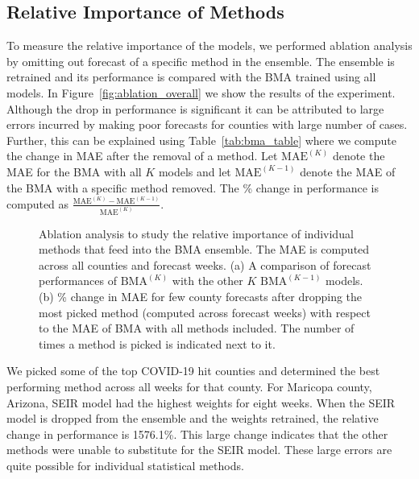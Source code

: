 \documentclass[sigconf]{acmart}
\begin{document}
\subsection{Relative Importance of Methods}
To measure the relative importance of the models, we performed ablation analysis by omitting out forecast of a specific method in the ensemble. The ensemble is retrained and its performance is compared with the BMA trained using all models. In Figure~\ref{fig:ablation_overall} we show the results of the experiment. Although the drop in performance is significant it can be attributed to large errors incurred by making poor forecasts for counties with large number of cases. Further, this can be explained using Table~\ref{tab:bma_table} where we compute the change in MAE after the removal of a method. Let $\text{MAE}^{(K)}$ denote the MAE for the BMA with all $K$ models and let $\text{MAE}^{(K-1)}$ denote the MAE of the BMA with a specific method removed. The \% change in performance is computed as $\frac{\text{MAE}^{(K)}-\text{MAE}^{(K-1)}}{\text{MAE}^{(K)}}$.  
\begin{figure}
    \centering
    \subfigure[]{\label{tab:bma_table}}
    \caption{Ablation analysis to study the relative importance of individual methods that feed into the BMA ensemble. The MAE is computed across all counties and forecast weeks. (a) A comparison of forecast performances of $\text{BMA}^{(K)}$ with the other $K$ $\text{BMA}^{(K-1)}$ models. (b)  \% change in MAE for few county forecasts after dropping the most picked method (computed across forecast weeks) with respect to the MAE of BMA with all methods included. The number of times a method is picked is indicated next to it.}
    
\end{figure}
  We picked some of the top COVID-19 hit counties and determined the best performing method across all weeks for that county. For Maricopa county, Arizona, SEIR model had the highest weights for eight weeks. When the SEIR model is dropped from the ensemble and the weights retrained, the relative change in performance is 1576.1\%. This large change indicates that the other methods were unable to substitute for the SEIR model. These large errors are quite possible for individual statistical methods.     
\end{document}
